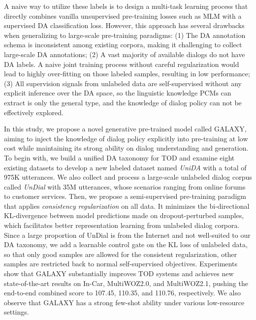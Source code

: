 \documentclass[letterpaper]{article} \usepackage{aaai22}  \usepackage{times}  \usepackage{helvet}  \usepackage{courier}  \usepackage[hyphens]{url}  \usepackage{graphicx} \urlstyle{rm} \def\UrlFont{\rm}  \usepackage{natbib}  \usepackage{caption} \DeclareCaptionStyle{ruled}{labelfont=normalfont,labelsep=colon,strut=off} \frenchspacing  \setlength{\pdfpagewidth}{8.5in}  \setlength{\pdfpageheight}{11in}  \usepackage{algorithm}
\begin{document}
A naive way to utilize these labels is to design a multi-task learning process \cite{sun2020ernie} that directly combines vanilla unsupervised pre-training losses such as MLM \cite{devlin2018bert} with a supervised DA classification loss.
However, this approach has several drawbacks when generalizing to large-scale pre-training paradigms: 
(1) The DA annotation schema is inconsistent among existing corpora, making it challenging to collect large-scale DA annotations;
(2) A vast majority of available dialogs do not have DA labels. A naive joint training process without careful regularization would lead to highly over-fitting on those labeled samples, resulting in low performance;
(3) All supervision signals from unlabeled data are self-supervised without any explicit inference over the DA space, so the linguistic knowledge PCMs can extract is only the general type, and the knowledge of dialog policy can not be effectively explored. 











In this study, we propose a novel generative pre-trained model called GALAXY, aiming to inject the knowledge of dialog policy explicitly into pre-training at low cost while maintaining its strong ability on dialog understanding and generation.  
To begin with,  we build a unified DA taxonomy for TOD and examine eight existing datasets to  develop a new labeled dataset named \textit{UniDA} with a total of 975K utterances. We also collect and process a large-scale unlabeled dialog corpus called \textit{UnDial} with 35M utterances, whose scenarios ranging from online forums to customer services.
Then, we propose a  semi-supervised pre-training paradigm that applies \textit{consistency regularization} \cite{verma2019interpolation} on all data. It minimizes the bi-directional KL-divergence between model predictions made on dropout-perturbed samples, which facilitates better representation learning from unlabeled dialog corpora. 
Since a large proportion of UnDial is from the Internet and not well-suited to our DA taxonomy, we add a learnable control gate on the KL loss of unlabeled data, so that only good samples are allowed for the  consistent regularization, other samples are restricted back to normal self-supervised objectives.
Experiments show that GALAXY substantially improves TOD systems and achieves new state-of-the-art results on In-Car, MultiWOZ2.0, and MultiWOZ2.1, pushing the end-to-end combined score to 107.45, 110.35, and 110.76, respectively. We also observe that GALAXY has a strong few-shot ability under various low-resource settings.
\end{document}
